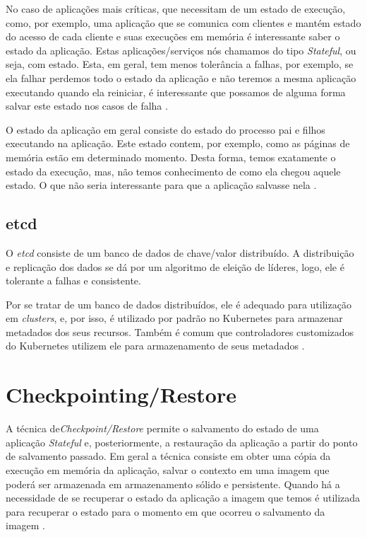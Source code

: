 No caso de aplicações mais críticas, que necessitam de um estado de execução,
como, por exemplo, uma aplicação que se comunica com clientes e mantém estado
do acesso de cada cliente e suas execuções em memória é interessante saber o
estado da aplicação. Estas aplicações/serviços nós chamamos do tipo
\textit{Stateful}, ou seja, com estado. Esta, em geral, tem menos tolerância
a falhas, por exemplo, se ela falhar perdemos todo o estado da aplicação e não
teremos a mesma aplicação executando quando ela reiniciar, é interessante que
possamos de alguma forma salvar este estado nos casos de falha
\cite{vayghan2021kubernetes}.

O estado da aplicação em geral consiste do estado do processo pai e filhos
executando na aplicação. Este estado contem, por exemplo, como as páginas
de memória estão em determinado momento. Desta forma, temos exatamente o
estado da execução, mas, não temos conhecimento de como ela chegou aquele
estado. O que não seria interessante para que a aplicação salvasse nela
\cite{oh2018stateful}.

\subsection{etcd}

O \textit{etcd} consiste de um banco de dados de chave/valor distribuído.
A distribuição e replicação dos dados se dá por um algoritmo de eleição de
líderes, logo, ele é tolerante a falhas e consistente. \cite{etcd}

Por se tratar de um banco de dados distribuídos, ele é adequado para
utilização em \textit{clusters}, e, por isso, é utilizado por padrão no
Kubernetes para armazenar metadados dos seus recursos. Também é comum que
controladores customizados do Kubernetes utilizem ele para armazenamento
de seus metadados \cite{kubernetes:etcd}.

\section{Checkpointing/Restore}

A técnica de\textit{Checkpoint/Restore} permite o salvamento do estado de
uma aplicação \textit{Stateful} e, posteriormente, a restauração da
aplicação a partir do ponto de salvamento passado. Em geral a técnica
consiste em obter uma cópia da execução em memória da aplicação, salvar o
contexto em uma imagem que poderá ser armazenada em armazenamento sólido e
persistente. Quando há a necessidade de se recuperar o estado da aplicação
a imagem que temos é utilizada para recuperar o estado para o momento em
que ocorreu o salvamento da imagem \cite{laadan2010linux}.

